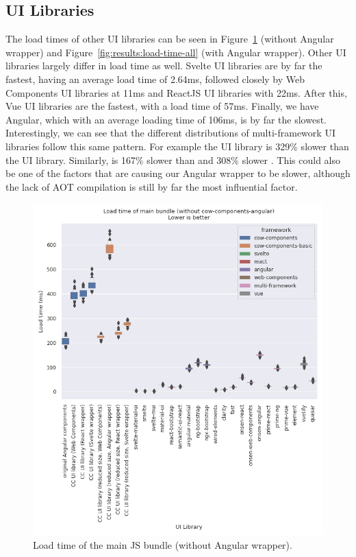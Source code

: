 \subsection{UI Libraries}
The load times of other UI libraries can be seen in Figure~\ref{fig:results:load-time-all-no-angular} (without Angular wrapper) and Figure~\ref{fig:results:load-time-all} (with Angular wrapper). Other UI libraries largely differ in load time as well. Svelte UI libraries are by far the fastest, having an average load time of 2.64ms, followed closely by Web Components UI libraries at 11ms and ReactJS UI libraries with 22ms. After this, Vue UI libraries are the fastest, with a load time of 57ms. Finally, we have Angular, which with an average loading time of 106ms, is by far the slowest. Interestingly, we can see that the different distributions of multi-framework UI libraries follow this same pattern. For example the  UI library is 329\% slower than the  UI library. Similarly,  is 167\% slower than  and 308\% slower . This could also be one of the factors that are causing our Angular wrapper to be slower, although the lack of AOT compilation is still by far the most influential factor.

\begin{figure}[h]
  \includegraphics[width=\columnwidth]{plots/load-time-all-no-angular.png}
  \caption{Load time of the main JS bundle (without Angular wrapper).}
  \label{fig:results:load-time-all-no-angular}
  \centering
\end{figure}


